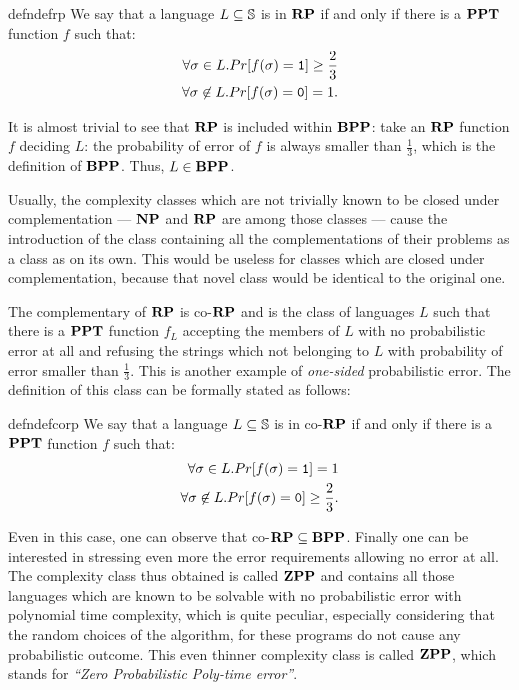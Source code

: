 \begin{restatable}[Class $\RP$]{defn}{defrp}
  \label{def:rpinformal}
We say that a language $L\subseteq \mathbb{S}$ is in $\RP$ if and only if
there is a
$\mathbf{PPT}$ function $f$ such that:
\begin{align*}
\forall \sigma \in L. Pr[f(\sigma) = \mathtt{1}]\ge \frac 2 3\\
\forall \sigma \not\in L. Pr[f(\sigma) = \mathtt{0}]= 1.
\end{align*}
\end{restatable}
\noindent
It is almost trivial to see that $\RP$ is included within $\mathbf{BPP}$:
take an $\RP$ function $f$ deciding $L$:
the probability of error of $f$ is always
smaller than $\frac 1 3$, which is the definition of $\mathbf{BPP}$. Thus, $L \in \mathbf{BPP}$.

Usually, the complexity classes which are not trivially known to be closed
under complementation --- $\mathbf{NP}$ and $\RP$ are among those classes ---
cause the introduction of the class containing all the
complementations of their problems as a class as on its own. This
would be useless for classes which are closed under complementation, because that
novel class would be identical to the original one.

The complementary of $\RP$ is co-$\RP$ and is the class of
languages $L$ such that there is a $\mathbf{PPT}$ function $f_L$ accepting
the members of $L$
with no probabilistic error at all
and refusing the strings which not belonging to $L$
with probability of error smaller than $\frac 1 3$.
This is another example of \emph{one-sided} probabilistic error.
The definition of this class can be formally
stated as follows:

\begin{restatable}[Class co-$\RP$]{defn}{defcorp}
  \label{def:corpinformal}
We say that a language $L\subseteq \mathbb{S}$ is in co-$\RP$ if and only if
there is a
$\mathbf{PPT}$ function $f$ such that:
\begin{align*}
\forall \sigma \in L. Pr[f(\sigma) = \mathtt{1}]= 1\\
\forall \sigma \not\in L. Pr[f(\sigma) = \mathtt{0}]\ge \frac 2 3.
\end{align*}
\end{restatable}

\noindent
Even in this case, one can observe that co-$\mathbf{RP}\subseteq \mathbf{BPP}$.
%
Finally one can be interested in stressing even more the error requirements
allowing no error at all. The complexity class thus obtained is called $\mathbf{ZPP}$
and contains all those languages which are known to
be solvable with no probabilistic error with polynomial time complexity,
which is quite peculiar, especially considering that the random choices
of the algorithm, for these programs do not cause any probabilistic outcome.
%
This even thinner complexity class is called $\mathbf{ZPP}$, which stands for \emph{``Zero Probabilistic Poly-time error''}.

